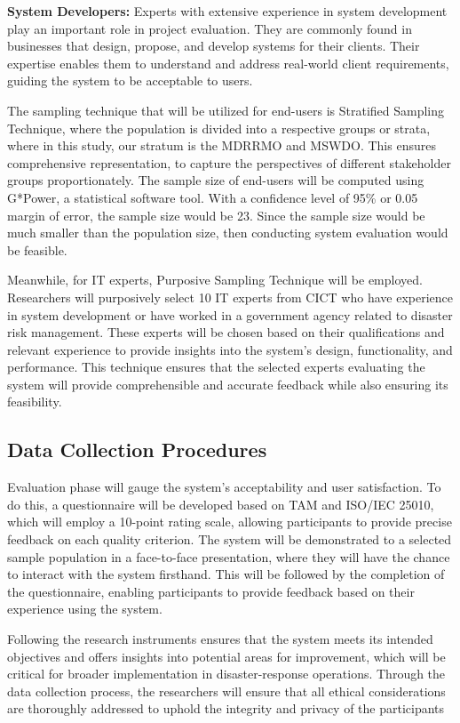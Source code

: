 	\textbf{System Developers:} Experts with extensive experience in system development play an important role in project evaluation. They are commonly found in businesses that design, propose, and develop systems for their clients. Their expertise enables them to understand and address real-world client requirements, guiding the system to be acceptable to users.
	
	The sampling technique that will be utilized for end-users is Stratified Sampling Technique, where the population is divided into a respective groups or strata, where in this study, our stratum is the MDRRMO and MSWDO. This ensures comprehensive representation, to capture the perspectives of different stakeholder groups proportionately. The sample size of end-users will be computed using G*Power, a statistical software tool. With a confidence level of 95\% or 0.05 margin of error, the sample size would be 23. Since the sample size would be much smaller than the population size, then conducting system evaluation would be feasible.
	
	Meanwhile, for IT experts, Purposive Sampling Technique will be employed. Researchers will purposively select 10 IT experts from CICT who have experience in system development or have worked in a government agency related to disaster risk management. These experts will be chosen based on their qualifications and relevant experience to provide insights into the system's design, functionality, and performance. This technique ensures that the selected experts evaluating the system will provide comprehensible and accurate feedback while also ensuring its feasibility.
	
\subsection{Data Collection Procedures}
	Evaluation phase will gauge the system’s acceptability and user satisfaction. To do this, a questionnaire will be developed based on TAM and ISO/IEC 25010, which will employ a 10-point rating scale, allowing participants to provide precise feedback on each quality criterion. The system will be demonstrated to a selected sample population in a face-to-face presentation, where they will have the chance to interact with the system firsthand. This will be followed by the completion of the questionnaire, enabling participants to provide feedback based on their experience using the system.
	
	Following the research instruments ensures that the system meets its intended objectives and offers insights into potential areas for improvement, which will be critical for broader implementation in disaster-response operations. Through the data collection process, the researchers will ensure that all ethical considerations are thoroughly addressed to uphold the integrity and privacy of the participants

